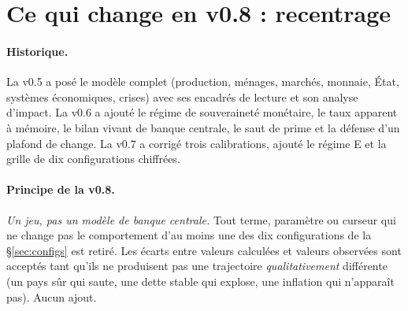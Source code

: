 \documentclass[11pt,a4paper]{article}
\begin{document}
\section*{Ce qui change en v0.8 : recentrage}
\paragraph{Historique.} La v0.5 a posé le modèle complet (production, ménages, marchés, monnaie, État, systèmes économiques, crises) avec ses encadrés de lecture et son analyse d'impact. La v0.6 a ajouté le régime de souveraineté monétaire, le taux apparent à mémoire, le bilan vivant de banque centrale, le saut de prime et la défense d'un plafond de change. La v0.7 a corrigé trois calibrations, ajouté le régime E et la grille de dix configurations chiffrées.

\paragraph{Principe de la v0.8.} \emph{Un jeu, pas un modèle de banque centrale.} Tout terme, paramètre ou curseur qui ne change pas le comportement d'au moins une des dix configurations de la \S\ref{sec:configs} est retiré. Les écarts entre valeurs calculées et valeurs observées sont acceptés tant qu'ils ne produisent pas une trajectoire \emph{qualitativement} différente (un pays sûr qui saute, une dette stable qui explose, une inflation qui n'apparaît pas). Aucun ajout.
\end{document}
